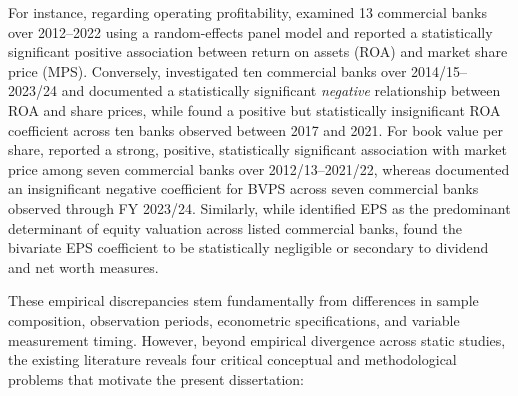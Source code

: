 For instance, regarding operating profitability, \citet{chhetri2023} examined 13 commercial banks over 2012--2022 using a random-effects panel model and reported a statistically significant positive association between return on assets (ROA) and market share price (MPS). Conversely, \citet{chaudhari2025} investigated ten commercial banks over 2014/15--2023/24 and documented a statistically significant \textit{negative} relationship between ROA and share prices, while \citet{gyawali2022} found a positive but statistically insignificant ROA coefficient across ten banks observed between 2017 and 2021. For book value per share, \citet{joshi2023} reported a strong, positive, statistically significant association with market price among seven commercial banks over 2012/13--2021/22, whereas \citet{pant2024} documented an insignificant negative coefficient for BVPS across seven commercial banks observed through FY 2023/24. Similarly, while \citet{bhandari2026} identified EPS as the predominant determinant of equity valuation across listed commercial banks, \citet{giri2024} found the bivariate EPS coefficient to be statistically negligible or secondary to dividend and net worth measures.

These empirical discrepancies stem fundamentally from differences in sample composition, observation periods, econometric specifications, and variable measurement timing. However, beyond empirical divergence across static studies, the existing literature reveals four critical conceptual and methodological problems that motivate the present dissertation:

